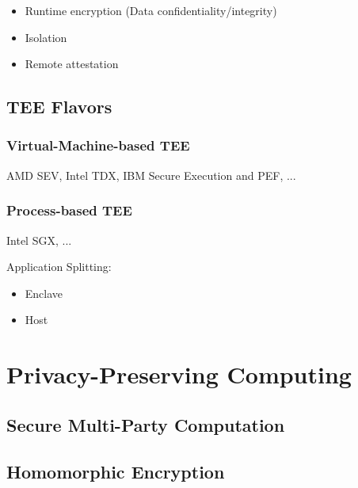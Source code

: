 \begin{itemize}
  \item Runtime encryption (Data confidentiality/integrity)
  \item Isolation
  \item Remote attestation
\end{itemize}

\section{TEE Flavors}

\subsection{Virtual-Machine-based TEE}

AMD SEV, Intel TDX, IBM Secure Execution and PEF, ...

\subsection{Process-based TEE}

Intel SGX, ...

Application Splitting:

\begin{itemize}
  \item Enclave
  \item Host
\end{itemize}


\chapter{Privacy-Preserving Computing}

\section{Secure Multi-Party Computation}

\section{Homomorphic Encryption}


